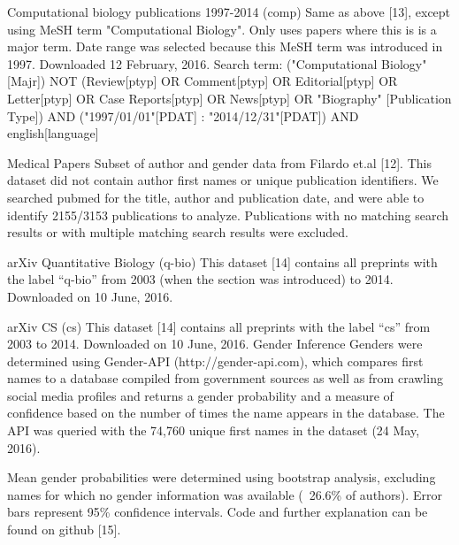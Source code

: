 \documentclass[11pt]{article}
\begin{document}
Computational biology publications 1997-2014 (comp)
Same as above [13], except using MeSH term "Computational Biology". Only uses papers where this is is a major term. Date range was selected because this MeSH term was introduced in 1997. Downloaded 12 February, 2016. Search term: ("Computational Biology"[Majr]) NOT (Review[ptyp] OR Comment[ptyp] OR Editorial[ptyp] OR Letter[ptyp] OR Case Reports[ptyp] OR News[ptyp] OR "Biography" [Publication Type]) AND ("1997/01/01"[PDAT] : "2014/12/31"[PDAT]) AND english[language]

Medical Papers
Subset of author and gender data from Filardo et.al [12]. This dataset did not contain author first names or unique publication identifiers. We searched pubmed for the title, author and publication date, and were able to identify 2155/3153 publications to analyze. Publications with no matching search results or with multiple matching search results were excluded.

arXiv Quantitative Biology (q-bio)
This dataset [14] contains all preprints with the label “q-bio” from 2003 (when the section was introduced) to 2014. Downloaded on 10 June, 2016.

arXiv CS (cs)
This dataset [14] contains all preprints with the label “cs” from 2003 to 2014. Downloaded on 10 June, 2016.
Gender Inference
Genders were determined using Gender-API (http://gender-api.com), which compares first names to a database compiled from government sources as well as from crawling social media profiles and returns a gender probability and a measure of confidence based on the number of times the name appears in the database. The API was queried with the 74,760 unique first names in the dataset (24 May, 2016).

Mean gender probabilities were determined using bootstrap analysis, excluding names for which no gender information was available (~26.6\% of authors). Error bars represent 95\% confidence intervals. Code and further explanation can be found on github [15].
\end{document}
